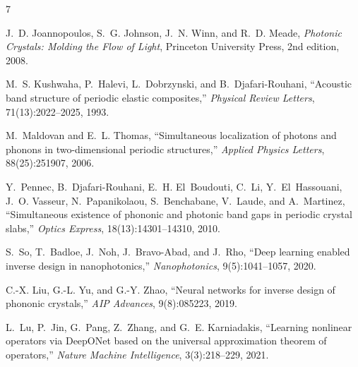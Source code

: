 \documentclass[11pt]{article}
\begin{document}
\begin{thebibliography}{7}

J.~D. Joannopoulos, S.~G. Johnson, J.~N. Winn, and R.~D. Meade,
\newblock \emph{Photonic Crystals: Molding the Flow of Light},
\newblock Princeton University Press, 2nd edition, 2008.

M.~S. Kushwaha, P.~Halevi, L.~Dobrzynski, and B.~Djafari-Rouhani,
\newblock ``Acoustic band structure of periodic elastic composites,''
\newblock \emph{Physical Review Letters}, 71(13):2022--2025, 1993.

M.~Maldovan and E.~L. Thomas,
\newblock ``Simultaneous localization of photons and phonons in two-dimensional periodic structures,''
\newblock \emph{Applied Physics Letters}, 88(25):251907, 2006.

Y.~Pennec, B.~Djafari-Rouhani, E.~H. El~Boudouti, C.~Li, Y.~El~Hassouani, J.~O. Vasseur, N.~Papanikolaou, S.~Benchabane, V.~Laude, and A.~Martinez,
\newblock ``Simultaneous existence of phononic and photonic band gaps in periodic crystal slabs,''
\newblock \emph{Optics Express}, 18(13):14301--14310, 2010.

S.~So, T.~Badloe, J.~Noh, J.~Bravo-Abad, and J.~Rho,
\newblock ``Deep learning enabled inverse design in nanophotonics,''
\newblock \emph{Nanophotonics}, 9(5):1041--1057, 2020.

C.-X. Liu, G.-L. Yu, and G.-Y. Zhao,
\newblock ``Neural networks for inverse design of phononic crystals,''
\newblock \emph{AIP Advances}, 9(8):085223, 2019.

L.~Lu, P.~Jin, G.~Pang, Z.~Zhang, and G.~E. Karniadakis,
\newblock ``Learning nonlinear operators via {DeepONet} based on the universal approximation theorem of operators,''
\newblock \emph{Nature Machine Intelligence}, 3(3):218--229, 2021.

\end{thebibliography}
\end{document}
